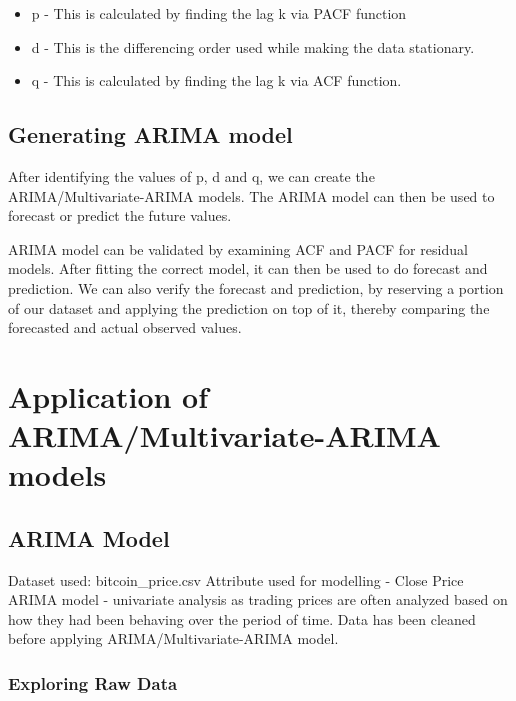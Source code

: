 \documentclass{article}
\begin{document}
\begin{itemize}
	\item p - This is calculated by finding the lag k via PACF function
	\item d - This is the differencing order used while making the data stationary.
	\item q - This is calculated by finding the lag k via ACF function.
\end{itemize}

\subsection{Generating ARIMA model}

After identifying the values of p, d and q, we can create the ARIMA/Multivariate-ARIMA models.
The ARIMA model can then be used to forecast or predict the future values.\linebreak

ARIMA model can be validated by examining ACF and PACF for residual models.
After fitting the correct model, it can then be used to do forecast and prediction.\linebreak
We can also verify the forecast and prediction, by reserving a portion of our dataset and applying the prediction on top of it, thereby comparing the forecasted and actual
observed values.

\section{Application of ARIMA/Multivariate-ARIMA models}

\subsection{ARIMA Model}
Dataset used: bitcoin\_price.csv  \linebreak
Attribute used for modelling - Close Price  \linebreak
ARIMA model - univariate analysis as trading prices are often analyzed based on how they had been behaving over the period of time. \linebreak
Data has been cleaned before applying ARIMA/Multivariate-ARIMA model. \linebreak

\subsubsection{Exploring Raw Data}
\end{document}
